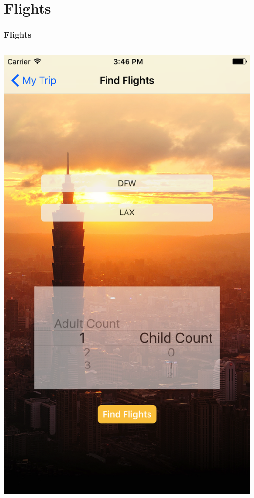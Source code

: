 \documentclass{beamer}
\begin{document}
\section{Flights}
\begin{frame}
\frametitle{Flights}
\begin{columns}
    \begin{column}{0.3\textwidth}
        \begin{center}
            \includegraphics[scale=0.08]{flightsSearch}

\end{center}
\end{column}
\end{columns}
\end{frame}
\end{document}
